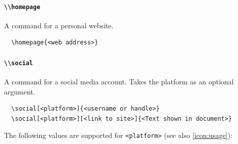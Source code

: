\documentclass[a4paper, 11pt]{article}
\newcommand{\code}[1]{\lstinline!#1!}
\begin{document}
\paragraph{\code{\\homepage}}
A command for a personal website.
\begin{lstlisting}
  \homepage{<web address>}
\end{lstlisting}

\paragraph{\code{\\social}}
A command for a social media account.
Takes the platform as an optional argument.
\begin{lstlisting}
  \social[<platform>]{<username or handle>}
  \social[<platform>][<link to site>]{<Text shown in document>}
\end{lstlisting}
The following values are supported for \code{<platform>} (see also \ref{icon:usage}):
\end{document}
